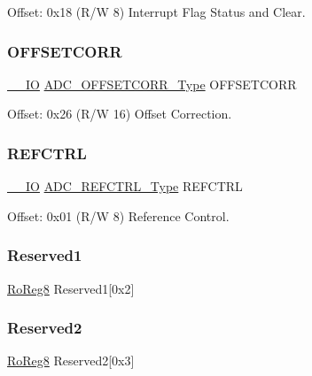 Offset\+: 0x18 (R/W 8) Interrupt Flag Status and Clear. 

\mbox{\label{struct_adc_ad3d1c8b252c6e69b36ef4d6be129a301}} 
\subsubsection{\texorpdfstring{OFFSETCORR}{OFFSETCORR}}
{\footnotesize\ttfamily \mbox{\hyperlink{core__cm0plus_8h_aec43007d9998a0a0e01faede4133d6be}{\+\_\+\+\_\+\+IO}} \mbox{\hyperlink{union_a_d_c___o_f_f_s_e_t_c_o_r_r___type}{A\+D\+C\+\_\+\+O\+F\+F\+S\+E\+T\+C\+O\+R\+R\+\_\+\+Type}} O\+F\+F\+S\+E\+T\+C\+O\+RR}



Offset\+: 0x26 (R/W 16) Offset Correction. 

\mbox{\label{struct_adc_a875aa333f294147bbd96345fb59a9a64}} 
\subsubsection{\texorpdfstring{REFCTRL}{REFCTRL}}
{\footnotesize\ttfamily \mbox{\hyperlink{core__cm0plus_8h_aec43007d9998a0a0e01faede4133d6be}{\+\_\+\+\_\+\+IO}} \mbox{\hyperlink{union_a_d_c___r_e_f_c_t_r_l___type}{A\+D\+C\+\_\+\+R\+E\+F\+C\+T\+R\+L\+\_\+\+Type}} R\+E\+F\+C\+T\+RL}



Offset\+: 0x01 (R/W 8) Reference Control. 

\mbox{\label{struct_adc_a3e42d171d4eb8eda7a030a3453f2d9c0}} 
\subsubsection{\texorpdfstring{Reserved1}{Reserved1}}
{\footnotesize\ttfamily \mbox{\hyperlink{group___s_a_m_d21_e15_a__definitions_ga0d957f1433aaf5d70e4dc2b68288442d}{Ro\+Reg8}} Reserved1\mbox{[}0x2\mbox{]}}

\mbox{\label{struct_adc_a3e3d4b7e35d84b272d434a1396e8b7be}} 
\subsubsection{\texorpdfstring{Reserved2}{Reserved2}}
{\footnotesize\ttfamily \mbox{\hyperlink{group___s_a_m_d21_e15_a__definitions_ga0d957f1433aaf5d70e4dc2b68288442d}{Ro\+Reg8}} Reserved2\mbox{[}0x3\mbox{]}}

